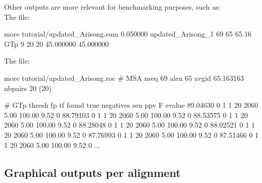 Other outputs are more relevant for benchmarking purposes, such as:\\
The  file:

\begin{sreoutput}
more tutorial/updated_Arisong.sum 
0.050000        updated_Arisong_1       69      65      65.16    GTp 9 20 20 45.000000 45.000000 
\end{sreoutput}

The  file:
\begin{sreoutput}
more tutorial/updated_Arisong.roc
# MSA nseq 69 alen 65 avgid 65.163163 nbpairs 20 (20)

# GTp thresh fp tf found true negatives sen ppv F evalue
89.04630 0 1 1 20 2060 5.00 100.00 9.52 0
88.79103 0 1 1 20 2060 5.00 100.00 9.52 0
88.53575 0 1 1 20 2060 5.00 100.00 9.52 0
88.28048 0 1 1 20 2060 5.00 100.00 9.52 0
88.02521 0 1 1 20 2060 5.00 100.00 9.52 0
87.76993 0 1 1 20 2060 5.00 100.00 9.52 0
87.51466 0 1 1 20 2060 5.00 100.00 9.52 0
...
\end{sreoutput}


\subsection{Graphical outputs per alignment}



